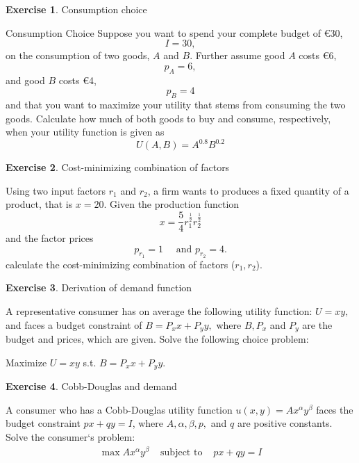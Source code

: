 \documentclass[
  12pt,
  oneside]{book}
\theoremstyle{definition}
\theoremstyle{definition}
\theoremstyle{definition}
\newtheorem{exercise}{Exercise}[chapter]
\theoremstyle{definition}
\theoremstyle{remark}
\begin{document}
\begin{exercise}
\protect\hypertarget{exr:consumptionlagr}{}\label{exr:consumptionlagr}Consumption choice

Consumption Choice Suppose you want to spend your complete budget of €30, \[I=30,\] on the consumption of two goods, \(A\) and \(B\). Further assume good \(A\) costs €6, \[p_A=6,\] and good \(B\) costs €4, \[p_B=4\] and that you want to maximize your utility that stems from consuming the two goods. Calculate how much of both goods to buy and consume, respectively, when your utility function is given as \[U(A,B)=A^{0.8}B^{0.2}\]
\end{exercise}

\begin{exercise}
\protect\hypertarget{exr:costlagr}{}\label{exr:costlagr}Cost-minimizing combination of factors

Using two input factors \(r_1\) and \(r_2\), a firm wants to produces a fixed quantity of a product, that is \(x=20\). Given the production function \[x=\frac{5}{4} r_1^{\frac{1}{2}} r_2^{\frac{1}{2}}\] and the factor prices \[p_{r_1}=1 \quad \text{ and } p_{r_2}=4.\] calculate the cost-minimizing combination of factors (\(r_1, r_2\)).
\end{exercise}

\begin{exercise}
\protect\hypertarget{exr:derilagr}{}\label{exr:derilagr}Derivation of demand function

A representative consumer has on average the following utility function: \(U=x y,\) and faces a budget constraint of \(B=P_{x} x+P_{y} y,\) where \(B, P_{x}\) and \(P_{y}\) are the budget and prices, which are given. Solve the following choice problem:

Maximize \(U=x y\) s.t. \(B=P_{x} x+P_{y} y\).
\end{exercise}

\begin{exercise}
\protect\hypertarget{exr:cddlagr}{}\label{exr:cddlagr}Cobb-Douglas and demand

A consumer who has a Cobb-Douglas utility function \(u(x, y)=A x^{\alpha} y^{\beta}\) faces the budget constraint \(p x+q y=I\), where \(A, \alpha, \beta, p,\) and \(q\) are positive constants. Solve the consumer`s problem: \[\begin{array}{lll} \max A x^{\alpha} y^{\beta} & \text { subject to } & p x+q y=I \end{array}\]
\end{exercise}
\end{document}

